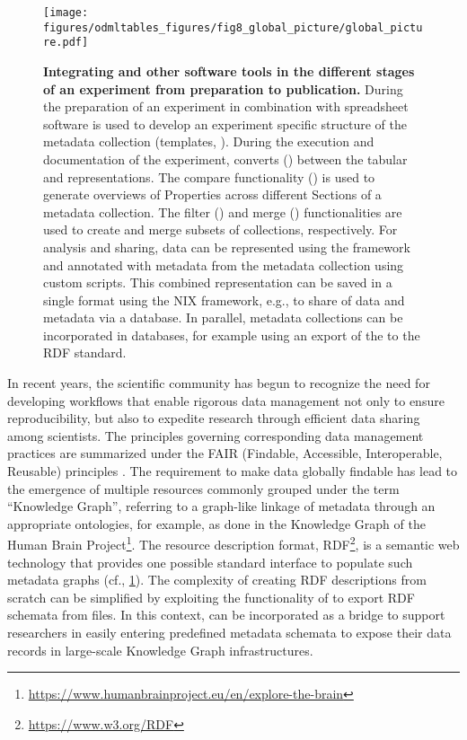 \begin{figure}[!ht]
\begin{center}
\texttt{[image: figures/odmltables\_figures/fig8\_global\_picture/global\_picture.pdf]}
\caption[Integrating  and other software tools in the different stages of an experiment from preparation to publication]{\label{fig:global_workflow}
\textbf{Integrating  and other software tools in the different stages of an experiment from preparation to publication.} During the preparation of an experiment  in combination with spreadsheet software is used to develop an experiment specific structure of the metadata collection (templates, \fgenerate{}). During the execution and documentation of the experiment,  converts (\fconvert{}) between the tabular and  representations. The compare functionality (\fcompare{}) is used to generate overviews of  Properties across different Sections of a metadata collection. The filter (\ffilter{}) and merge (\fmerge{}) functionalities are used to create and merge subsets of  collections, respectively. For analysis and sharing, data can be represented using the  framework and annotated with metadata from the  metadata collection using custom scripts. This combined representation can be saved in a single format using the NIX framework, e.g., to share of data and metadata via a database. In parallel, metadata collections can be incorporated in databases, for example using an export of the  to the RDF standard.}
\end{center}
\end{figure}

In recent years, the scientific community has begun to recognize the need for developing workflows that enable rigorous data management not only to ensure reproducibility, but also to expedite research through efficient data sharing among scientists. The principles governing corresponding data management practices are summarized under the FAIR (Findable, Accessible, Interoperable, Reusable) principles \citep{Wilkinson_2016}. The requirement to make data globally findable has lead to the emergence of multiple resources commonly grouped under the term ``Knowledge Graph'', referring to a graph-like linkage of metadata through an appropriate ontologies, for example, as done in the Knowledge Graph of the Human Brain Project\footnote{\url{https://www.humanbrainproject.eu/en/explore-the-brain}}. The resource description format, RDF\footnote{\url{https://www.w3.org/RDF}}, is a semantic web technology that provides one possible standard interface to populate such metadata graphs (cf., \cref{fig:global_workflow}). The complexity of creating RDF descriptions from scratch can be simplified by exploiting the functionality of  to export RDF schemata from  files. In this context,  can be incorporated as a bridge to support researchers in easily entering predefined metadata schemata to expose their data records in large-scale Knowledge Graph infrastructures.

